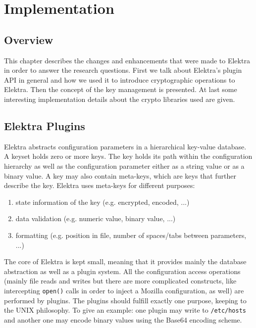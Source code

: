 \chapter{Implementation}

\section{Overview}

This chapter describes the changes and enhancements that were made to
Elektra in order to answer the research questions.
First we talk about Elektra's plugin API in general and how we used it
to introduce cryptographic operations to Elektra. Then the concept of
the key management is presented. At last some interesting implementation
details about the crypto libraries used are given.

\section{Elektra Plugins}\label{elektra-plugins}

Elektra abstracts configuration parameters in a hierarchical key-value database.
A keyset holds zero or more keys.
The key holds its path within the configuration hierarchy as well as the configuration parameter either as a string value or as a binary value.
A key may also contain meta-keys, which are keys that further describe the key.
Elektra uses meta-keys for different purposes:

\begin{enumerate}
\item state information of the key (e.g. encrypted, encoded, ...)
\item data validation (e.g. numeric value, binary value, ...)
\item formatting (e.g. position in file, number of spaces/tabs between parameters, ...)
\end{enumerate}

The core of Elektra is kept small, meaning that it provides mainly the
database abstraction as well as a plugin system. All the configuration
access operations (mainly file reads and writes but there are more
complicated constructs, like intercepting \texttt{open()} calls in
order to inject a Mozilla configuration, as well) are performed by
plugins. The plugins should fulfill exactly one purpose, keeping to the
UNIX philosophy. To give an example: one plugin may write to
\texttt{/etc/hosts} and another one may encode binary values using the
Base64 encoding scheme.

